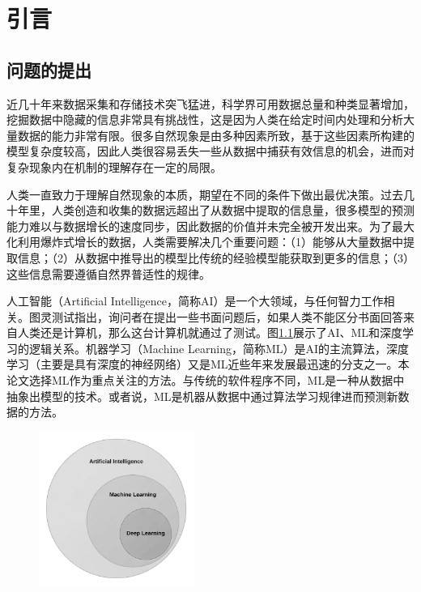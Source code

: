 \chapter{引言}\label{chap:introduction}

\section{问题的提出}\label{sec:intro_question}

近几十年来数据采集和存储技术突飞猛进，科学界可用数据总量和种类显著增加，挖掘数据中隐藏的信息非常具有挑战性，这是因为人类在给定时间内处理和分析大量数据的能力非常有限\citep{bougher2016machine}。很多自然现象是由多种因素所致，基于这些因素所构建的模型复杂度较高\citep{reitsma2010geoscience}，因此人类很容易丢失一些从数据中捕获有效信息的机会，进而对复杂现象内在机制的理解存在一定的局限\citep{feyyad1996data}。

人类一直致力于理解自然现象的本质，期望在不同的条件下做出最优决策。过去几十年里，人类创造和收集的数据远超出了从数据中提取的信息量，很多模型的预测能力难以与数据增长的速度同步，因此数据的价值并未完全被开发出来。为了最大化利用爆炸式增长的数据，人类需要解决几个重要问题：（1）能够从大量数据中提取信息；（2）从数据中推导出的模型比传统的经验模型能获取到更多的信息；（3）这些信息需要遵循自然界普适性的规律。

人工智能（Artificial Intelligence，简称AI）是一个大领域，与任何智力工作相关。图灵测试指出，询问者在提出一些书面问题后，如果人类不能区分书面回答来自人类还是计算机，那么这台计算机就通过了测试\citep{turing2009computing}。图\ref{fig:intro_AI_ML}展示了AI、ML和深度学习的逻辑关系。机器学习（Machine Learning，简称ML）是AI的主流算法，深度学习（主要是具有深度的神经网络）又是ML近些年来发展最迅速的分支之一。本论文选择ML作为重点关注的方法。与传统的软件程序不同，ML是一种从数据中抽象出模型的技术。或者说，ML是机器从数据中通过算法学习规律进而预测新数据的方法。

\begin{figure}[!htbp]
  \centering
  \noindent\includegraphics[width=0.45\textwidth]{Img/chap1_intro/AI_ML.png}
  \vspace{-0.6cm}
  \label{fig:intro_AI_ML}
\end{figure}

